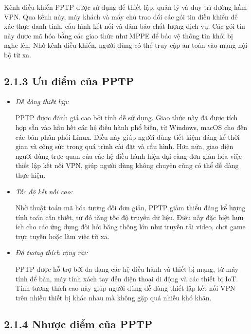     Kênh điều khiển PPTP được sử dụng để thiết lập, quản lý và duy trì đường hầm VPN. Qua kênh này, máy khách và máy chủ trao đổi các gói tin điều khiển để xác thực danh tính, cấu hình kết nối và đảm bảo chất lượng dịch vụ. Các gói tin này được mã hóa bằng các giao thức như MPPE để bảo vệ thông tin khỏi bị nghe lén. Nhờ kênh điều khiển, người dùng có thể truy cập an toàn vào mạng nội bộ từ xa.
    \subsection*{2.1.3 Ưu điểm của PPTP}
    \begin{itemize}
        \item \textit{Dễ dàng thiết lập:}
        
        PPTP được đánh giá cao bởi tính dễ sử dụng. Giao thức này đã được tích hợp sẵn vào hầu hết các hệ điều hành phổ biến, từ Windows, macOS cho đến các bản phân phối Linux. Điều này giúp người dùng tiết kiệm đáng kể thời gian và công sức trong quá trình cài đặt và cấu hình. Hơn nữa, giao diện người dùng trực quan của các hệ điều hành hiện đại càng đơn giản hóa việc thiết lập kết nối VPN, giúp người dùng không chuyên cũng có thể dễ dàng thực hiện.
        \item \textit{Tốc độ kết nối cao:}

        Nhờ thuật toán mã hóa tương đối đơn giản, PPTP giảm thiểu đáng kể lượng tính toán cần thiết, từ đó tăng tốc độ truyền dữ liệu. Điều này đặc biệt hữu ích cho các ứng dụng đòi hỏi băng thông lớn như truyền tải video, chơi game trực tuyến hoặc làm việc từ xa.

        \item \textit{Độ tương thích rộng rãi:}

        PPTP được hỗ trợ bởi đa dạng các hệ điều hành và thiết bị mạng, từ máy tính để bàn, máy tính xách tay đến điện thoại di động và các thiết bị IoT. Tính tương thích cao này giúp người dùng dễ dàng thiết lập kết nối VPN trên nhiều thiết bị khác nhau mà không gặp quá nhiều khó khăn.
    \end{itemize}
    \subsection*{2.1.4 Nhược điểm của PPTP}

